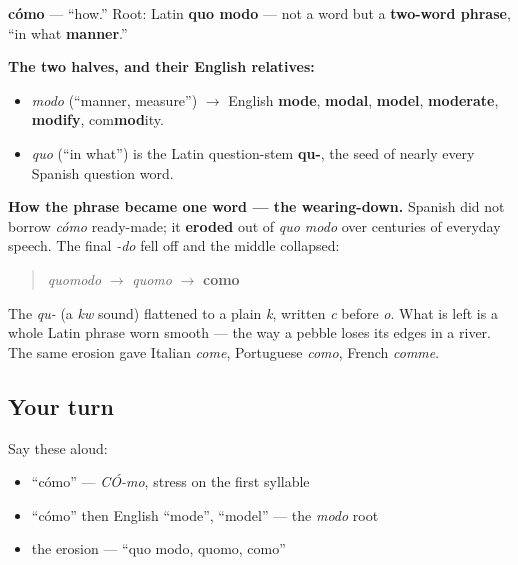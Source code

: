 \begin{cousinweb}
\textbf{cómo} — \textquotedblleft{}how.\textquotedblright{} Root: Latin \textbf{quo modo} — not a word but a \textbf{two-word phrase}, \textquotedblleft{}in what \textbf{manner}.\textquotedblright{}

\textbf{The two halves, and their English relatives:}

\begin{itemize}
\raggedright
  \item \emph{modo} (\textquotedblleft{}manner, measure\textquotedblright{}) $\to$ English \textbf{mode}, \textbf{modal}, \textbf{model}, \textbf{moderate}, \textbf{modify}, com\textbf{mod}ity.
  \item \emph{quo} (\textquotedblleft{}in what\textquotedblright{}) is the Latin question-stem \textbf{qu-}, the seed of nearly every Spanish question word.
\end{itemize}

\textbf{How the phrase became one word — the wearing-down.} Spanish did not borrow \emph{cómo} ready-made; it \textbf{eroded} out of \emph{quo modo} over centuries of everyday speech. The final \emph{-do} fell off and the middle collapsed:

\begin{quote}
\emph{quomodo} $\to$ \emph{quomo} $\to$ \textbf{como}
\end{quote}

The \emph{qu-} (a \emph{kw} sound) flattened to a plain \emph{k}, written \emph{c} before \emph{o}. What is left is a whole Latin phrase worn smooth — the way a pebble loses its edges in a river. The same erosion gave Italian \emph{come}, Portuguese \emph{como}, French \emph{comme}.
\end{cousinweb}

\subsection*{Your turn}
Say these aloud:

\begin{itemize}
\raggedright
  \item \textquotedblleft{}cómo\textquotedblright{} — \emph{CÓ-mo}, stress on the first syllable
  \item \textquotedblleft{}cómo\textquotedblright{} then English \textquotedblleft{}mode\textquotedblright{}, \textquotedblleft{}model\textquotedblright{} — the \emph{modo} root
  \item the erosion — \textquotedblleft{}quo modo, quomo, como\textquotedblright{}
\end{itemize}


